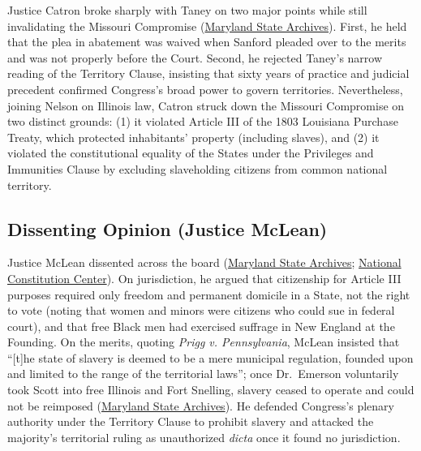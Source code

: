 \documentclass[12pt]{article}
\begin{document}
Justice Catron broke sharply with Taney on two major points while still invalidating the Missouri Compromise (\href{https://msa.maryland.gov/megafile/msa/speccol/sc5300/sc5339/000091/000000/000004/restricted/dred_scott/decision/catron.html}{Maryland State Archives}). First, he held that the plea in abatement was waived when Sanford pleaded over to the merits and was not properly before the Court. Second, he rejected Taney's narrow reading of the Territory Clause, insisting that sixty years of practice and judicial precedent confirmed Congress's broad power to govern territories. Nevertheless, joining Nelson on Illinois law, Catron struck down the Missouri Compromise on two distinct grounds: (1) it violated Article III of the 1803 Louisiana Purchase Treaty, which protected inhabitants' property (including slaves), and (2) it violated the constitutional equality of the States under the Privileges and Immunities Clause by excluding slaveholding citizens from common national territory.

\subsection{Dissenting Opinion (Justice McLean)}

Justice McLean dissented across the board (\href{https://msa.maryland.gov/megafile/msa/speccol/sc5300/sc5339/000091/000000/000004/restricted/dred_scott/decision/McLean.html}{Maryland State Archives}; \href{https://constitutioncenter.org/the-constitution/supreme-court-case-library/dred-scott-v-sandford}{National Constitution Center}). On jurisdiction, he argued that citizenship for Article III purposes required only freedom and permanent domicile in a State, not the right to vote (noting that women and minors were citizens who could sue in federal court), and that free Black men had exercised suffrage in New England at the Founding. On the merits, quoting \textit{Prigg v. Pennsylvania}, McLean insisted that ``[t]he state of slavery is deemed to be a mere municipal regulation, founded upon and limited to the range of the territorial laws''; once Dr.\ Emerson voluntarily took Scott into free Illinois and Fort Snelling, slavery ceased to operate and could not be reimposed (\href{https://msa.maryland.gov/megafile/msa/speccol/sc5300/sc5339/000091/000000/000004/restricted/dred_scott/decision/McLean.html}{Maryland State Archives}). He defended Congress's plenary authority under the Territory Clause to prohibit slavery and attacked the majority's territorial ruling as unauthorized \textit{dicta} once it found no jurisdiction.
\end{document}
